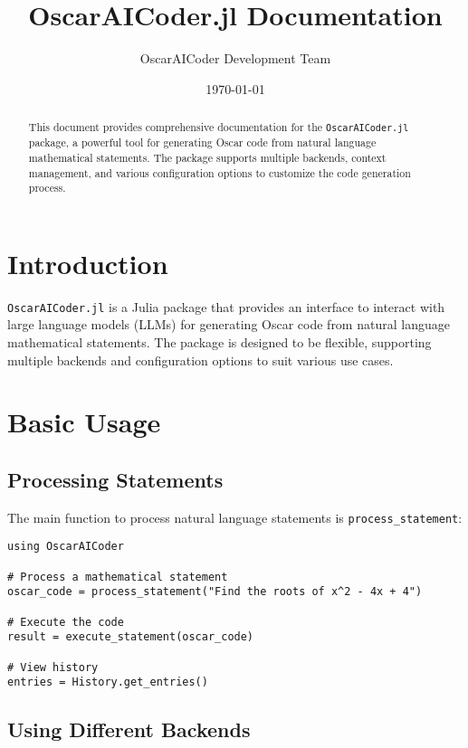 \documentclass[11pt,a4paper]{article}
\title{OscarAICoder.jl Documentation}
\author{OscarAICoder Development Team}
\date{\today}
\newcommand{\func}[1]{\texttt{#1}}
\newcommand{\modname}[1]{\texttt{#1}}
\begin{document}
\maketitle
\thispagestyle{empty}

\begin{abstract}
  This document provides comprehensive documentation for the
  \modname{OscarAICoder.jl} package, a powerful tool for generating Oscar code
  from natural language mathematical statements. The package supports multiple
  backends, context management, and various configuration options to customize
  the code generation process.
\end{abstract}

\section{Introduction}
\label{sec:introduction}

\modname{OscarAICoder.jl} is a Julia package that provides an interface to interact with large language models (LLMs) for generating Oscar code from natural language mathematical statements. The package is designed to be flexible, supporting multiple backends and configuration options to suit various use cases.

\section{Basic Usage}
\label{sec:basic_usage}

\subsection{Processing Statements}

The main function to process natural language statements is \func{process\_statement}:

\begin{lstlisting}
using OscarAICoder

# Process a mathematical statement
oscar_code = process_statement("Find the roots of x^2 - 4x + 4")

# Execute the code
result = execute_statement(oscar_code)

# View history
entries = History.get_entries()
\end{lstlisting}

\subsection{Using Different Backends}
\end{document}
